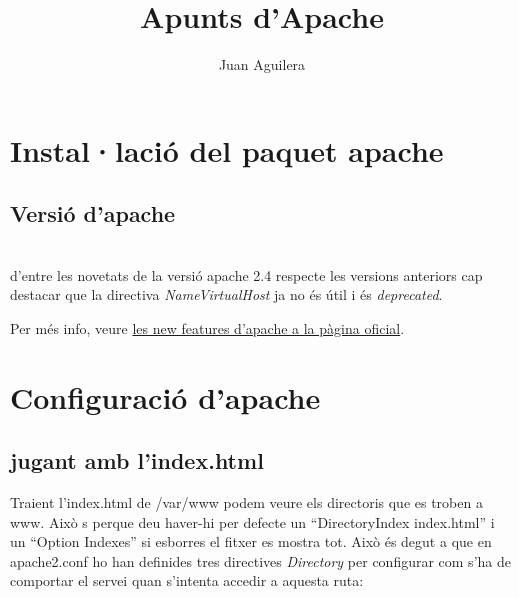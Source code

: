 \documentclass[a4paper, 11pt]{article}
\begin{document}
\title{Apunts d'Apache}
\author{Juan Aguilera}
\maketitle


\tableofcontents
\newpage

\section{Instal·laci\'o del paquet apache}
\subsection{Versió d'apache}
 \\
d'entre les novetats de la versió apache 2.4 respecte les versions anteriors cap destacar que la directiva \textit{NameVirtualHost} ja no \'es útil i \'es \textit{deprecated}.

Per m\'es info, veure \href{https://httpd.apache.org/docs/2.4/new_features_2_4.html}{les new features d'apache a la pàgina oficial}\cite{DOC}.

\section{Configuració d'apache}
\subsection{jugant amb l'index.html}
Traient l'index.html de /var/www podem veure els directoris que es troben a www. Això s perque deu haver-hi per defecte un “DirectoryIndex index.html” i un “Option Indexes” si esborres el fitxer es mostra tot. Això \'es degut a que en apache2.conf ho han definides tres directives \textit{Directory} per configurar com s'ha de comportar el servei quan s'intenta accedir a aquesta ruta:
\end{document}
